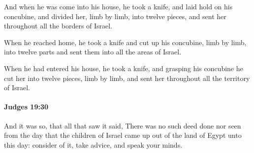 			\begin{versebox}
					\item[BHS] 
					\item[ASV] And when he was come into his house, he took a knife, and laid hold on his concubine, and divided her, limb by limb, into twelve pieces, and sent her throughout all the borders of Israel.
					\item[NIV] When he reached home, he took a knife and cut up his concubine, limb by limb, into twelve parts and sent them into all the areas of Israel.
					\item[NRSV] When he had entered his house, he took a knife, and grasping his concubine he cut her into twelve pieces, limb by limb, and sent her throughout all the territory of Israel.
			\end{versebox}

		\paragraph{Judges 19:30} %
			\label{JUDGES-19-30}

			And it was so, that all that saw it said, There was no such deed done nor seen from the day that the children of Israel came up out of the land of Egypt unto this day: consider of it, take advice, and speak your minds.


